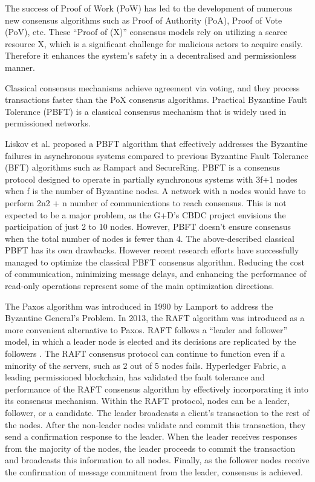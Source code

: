 \documentclass[
  english,        %
  font=times,     %
  onecolumn,      %
]{tumarticle}
\begin{document}
\hspace{1em} The success of Proof of Work (PoW) has led to the development of numerous new consensus algorithms such as Proof of Authority (PoA), Proof of Vote (PoV), etc. These “Proof of (X)” consensus models rely on utilizing a scarce resource X, which is a significant challenge for malicious actors to acquire easily. Therefore it enhances the system's safety in a decentralised and permissionless manner.

\hspace{1em} Classical consensus mechanisms achieve agreement via voting, and they process transactions faster than the PoX consensus algorithms. Practical Byzantine Fault Tolerance (PBFT) is a classical consensus mechanism that is widely used in permissioned networks. 

\hspace{1em} Liskov et al. \cite{zbierski2015parallel} proposed a PBFT algorithm that effectively addresses the Byzantine failures in asynchronous systems compared to previous Byzantine Fault Tolerance (BFT) algorithms such as Rampart and SecureRing. PBFT is a consensus protocol designed to operate in partially synchronous systems with 3f+1 nodes when f is the number of Byzantine nodes. A network with n nodes would have to perform 2n2 + n number of communications to reach consensus. This is not expected to be a major problem,  as the G+D's CBDC project envisions the participation of just 2 to 10 nodes. However, PBFT doesn't ensure consensus when the total number of nodes is fewer than 4. The above-described classical PBFT has its own drawbacks. However recent research efforts have successfully managed to optimize the classical PBFT consensus algorithm. Reducing the cost of communication, minimizing message delays, and enhancing the performance of read-only operations represent some of the main optimization directions. 

\hspace{1em} The Paxos algorithm was introduced in 1990 by Lamport to address the Byzantine General's Problem. In 2013, the RAFT algorithm was introduced as a more convenient alternative to Paxos. RAFT follows a “leader and follower” model, in which a leader node is elected and its decisions are replicated by the followers \cite{hyperledger}. The RAFT consensus protocol can continue to function even if a minority of the servers, such as 2 out of 5 nodes fails. Hyperledger Fabric, a leading permissioned blockchain, has validated the fault tolerance and performance of the RAFT consensus algorithm by effectively incorporating it into its consensus mechanism. Within the RAFT protocol, nodes can be a leader, follower, or a candidate. The leader broadcasts a client’s  transaction to the rest of the nodes. After the non-leader nodes validate and commit this transaction, they send a confirmation response to the leader.  When the leader receives responses from the majority of the nodes, the leader proceeds to commit the transaction and broadcasts this information to all nodes. Finally, as the follower nodes receive the confirmation of message commitment from the leader, consensus is achieved. 
\end{document}
